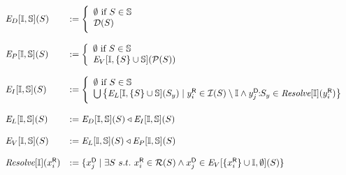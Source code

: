 \begin{figure}[t]
\renewcommand{\S}{\mathcal{S}}
$$
\begin{array}{ll}
 \Env{D}{\seeni}{\seens}{S} &:= \left\{
    \begin{array}{l}
      \emptyset  \text{ if } S\in\seens\\
      \D{S}\smallskip\\
    \end{array}
 \right.\\ \\
 \Env{P}{\seeni}{\seens}{S} & := \left\{
    \begin{array}{l}
      \emptyset  \text{ if } S\in\seens\\
      \Env{V}{\seeni}{\{S\}\cup\seens}{\P{S}}
    \end{array}
 \right.\\ \\
 \Env{I}{\seeni}{\seens}{S} &:= \left\{
    \begin{array}{l}
      \emptyset  \text{ if } S\in\seens\\
      \bigcup \left\{ \Env{L}{\seeni}{\{S\}\cup\seens}{S_y} \mid \ri{y}{i} \in \I{S} \setminus 
\seeni \wedge \dsi{y}{j}{S_y} \in \Res{\seeni}{\ri{y}{i}}\right\}\smallskip\\
    \end{array}
 \right.\\ \\
 \Env{L}{\seeni}{\seens}{S} & := \Env{D}{\seeni}{\seens}{S} \triangleleft \Env{I}{\seeni}{\seens}{S} \\ \\
  \Env{V}{\seeni}{\seens}{S}  & := \Env{L}{\seeni}{\seens}{S} \triangleleft \Env{P}{\seeni}{\seens}{S} \\ \\
  \Res{\seeni}{\ri{x}{i}} & := \{ \di{x}{j} \mid \exists S\ s.t.\ \ri{x}{i} \in \R{S} \wedge \di{x}{j} \in \Env{V}{\{\ri{x}{i}\} \cup \seeni}{\emptyset}{S} \}  \\
\end{array}\medskip
$$
\end{figure}
